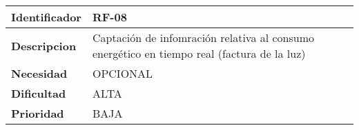 \begin{center}
    \begin{tabular}{|p{2.6cm}|p{12cm}|}
    \hline
    \textbf{Identificador} & RF-08\\
    \hline
    \textbf{Descripcion} & Captación de infomración relativa al consumo energético en tiempo real (factura de la luz)
    \\
    \hline
    \textbf{Necesidad} & OPCIONAL\\
    \hline
    \textbf{Dificultad} & ALTA\\
    \hline
    \textbf{Prioridad} & BAJA\\
    \hline
    \end{tabular}
\end{center}
